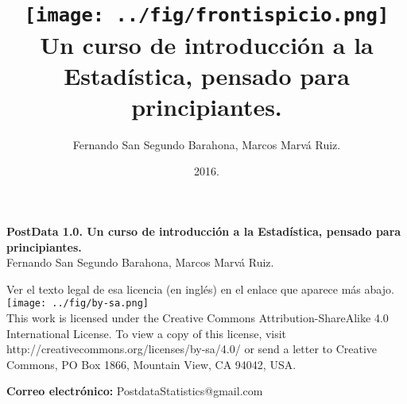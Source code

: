 \documentclass[10pt,a4paper]{book}
\begin{document}
	
	\frontmatter
	
	
	\author{Fernando San Segundo Barahona, Marcos Marvá Ruiz.}
	\title{
		\texttt{[image: ../fig/frontispicio.png]}\\[5mm]
		{\small
			Un curso de introducción a la Estadística, pensado para principiantes.}
	}
	\date{\small 2016.}
	
	\VerbatimFootnotes
	
	
	\maketitle
	
	\newpage
	
	\thispagestyle{empty}
	
	\small
	\noindent \textbf{PostData 1.0. Un curso de introducción a la Estadística, pensado para principiantes. } \\
	Fernando San Segundo Barahona, Marcos Marvá Ruiz.
	
	\vspace{1cm}
	  Ver el texto legal de esa licencia (en inglés) en el enlace que aparece más abajo.\\
	\noindent\texttt{[image: ../fig/by-sa.png]}\\
	{%
		\noindent
		This work is licensed under the Creative Commons Attribution-ShareAlike 4.0 International License. To view a copy of this license, visit http://creativecommons.org/licenses/by-sa/4.0/ or send a letter to Creative Commons, PO Box 1866, Mountain View, CA 94042, USA.}
	
	\vspace{2cm}
	\noindent
	{\bf Correo electrónico:} PostdataStatistics@gmail.com
	
\end{document}
